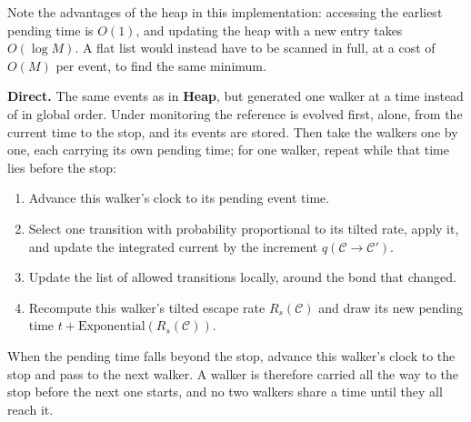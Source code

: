 \documentclass[11pt]{article}
\begin{document}
\begin{mdframed}[
    linewidth=0.8pt,
    roundcorner=3pt,
    backgroundcolor=black!5,
    innerleftmargin=8pt,
    innerrightmargin=8pt,
    innertopmargin=8pt,
    innerbottommargin=8pt]
\begin{enumerate}
Note the advantages of the heap in this implementation: accessing the earliest pending time is $O(1)$, and updating the heap with a new entry takes $O(\log M)$. A flat list would instead have to be scanned in full, at a cost of $O(M)$ per event, to find the same minimum.

\smallskip
\noindent\textcolor{dircol}{\textbf{Direct.}} The same events as in \textcolor{heapcol}{\textbf{Heap}}, but generated one walker at a time instead of in global order. Under monitoring the reference is evolved first, alone, from the current time to the stop, and its events are stored. Then take the walkers one by one, each carrying its own pending time; for one walker, repeat while that time lies before the stop:
\begin{enumerate}
\item Advance this walker's clock to its pending event time.
\item Select one transition with probability proportional to its tilted rate, apply it, and update the integrated current by the increment $q(\mathcal{C}\to\mathcal{C}')$.
\item Update the list of allowed transitions locally, around the bond that changed.
\item Recompute this walker's tilted escape rate $R_s(\mathcal{C})$ and draw its new pending time $t + \text{Exponential}(R_s(\mathcal{C}))$.
\end{enumerate}
When the pending time falls beyond the stop, advance this walker's clock to the stop and pass to the next walker. A walker is therefore carried all the way to the stop before the next one starts, and no two walkers share a time until they all reach it.


\end{enumerate}
\end{mdframed}
\end{document}
